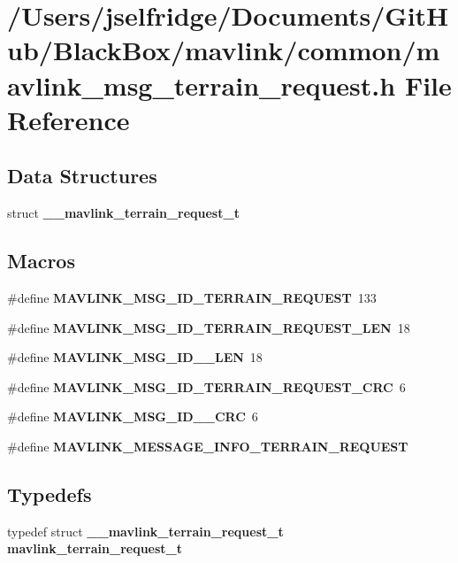 \section{/\+Users/jselfridge/\+Documents/\+Git\+Hub/\+Black\+Box/mavlink/common/mavlink\+\_\+msg\+\_\+terrain\+\_\+request.h File Reference}
\label{mavlink__msg__terrain__request_8h}
\subsection*{Data Structures}
\begin{DoxyCompactItemize}
\item 
struct \textbf{ \+\_\+\+\_\+mavlink\+\_\+terrain\+\_\+request\+\_\+t}
\end{DoxyCompactItemize}
\subsection*{Macros}
\begin{DoxyCompactItemize}
\item 
\#define \textbf{ M\+A\+V\+L\+I\+N\+K\+\_\+\+M\+S\+G\+\_\+\+I\+D\+\_\+\+T\+E\+R\+R\+A\+I\+N\+\_\+\+R\+E\+Q\+U\+E\+ST}~133
\item 
\#define \textbf{ M\+A\+V\+L\+I\+N\+K\+\_\+\+M\+S\+G\+\_\+\+I\+D\+\_\+\+T\+E\+R\+R\+A\+I\+N\+\_\+\+R\+E\+Q\+U\+E\+S\+T\+\_\+\+L\+EN}~18
\item 
\#define \textbf{ M\+A\+V\+L\+I\+N\+K\+\_\+\+M\+S\+G\+\_\+\+I\+D\+\_\+\_\+\+L\+EN}~18
\item 
\#define \textbf{ M\+A\+V\+L\+I\+N\+K\+\_\+\+M\+S\+G\+\_\+\+I\+D\+\_\+\+T\+E\+R\+R\+A\+I\+N\+\_\+\+R\+E\+Q\+U\+E\+S\+T\+\_\+\+C\+RC}~6
\item 
\#define \textbf{ M\+A\+V\+L\+I\+N\+K\+\_\+\+M\+S\+G\+\_\+\+I\+D\+\_\+\_\+\+C\+RC}~6
\item 
\#define \textbf{ M\+A\+V\+L\+I\+N\+K\+\_\+\+M\+E\+S\+S\+A\+G\+E\+\_\+\+I\+N\+F\+O\+\_\+\+T\+E\+R\+R\+A\+I\+N\+\_\+\+R\+E\+Q\+U\+E\+ST}
\end{DoxyCompactItemize}
\subsection*{Typedefs}
\begin{DoxyCompactItemize}
\item 
typedef struct \textbf{ \+\_\+\+\_\+mavlink\+\_\+terrain\+\_\+request\+\_\+t} \textbf{ mavlink\+\_\+terrain\+\_\+request\+\_\+t}
\end{DoxyCompactItemize}


